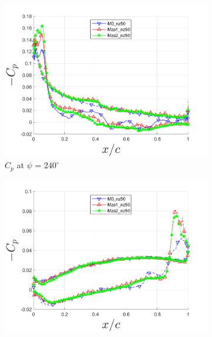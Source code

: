 \begin{figure}[H]
	\begin{subfigure}[b]{0.475\textwidth}
		\centering
		\includegraphics[width=1\textwidth]{figures/zonal_adapt_results/Cp_Re200k/Cp_ph_240.png}
		\caption{ $C_p$ at $\psi$ = $240^\circ$}
		\label{fig:zonal_Cp_Re200k_240}
	\end{subfigure}
	\begin{subfigure}[b]{0.475\textwidth}
		\centering
		\includegraphics[width=1\textwidth]{figures/zonal_adapt_results/Cp_Re200k/Cp_ph_300.png}

\end{subfigure}
\end{figure}
